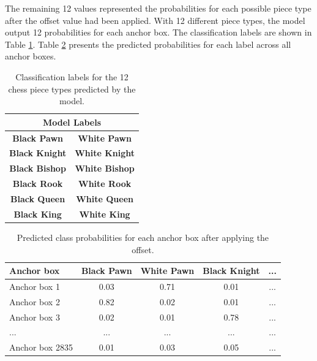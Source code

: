 The remaining 12 values represented the probabilities for each possible piece type after the offset value had been applied. With 12 different piece types, the model output 12 probabilities for each anchor box. The classification labels are shown in Table \ref{tab:piece-label-table}. Table \ref{tab:piece-probability-table} presents the predicted probabilities for each label across all anchor boxes. \\
\begin{table}[ht]
\renewcommand{\arraystretch}{1.2}  %
\centering
\caption[Labels for chess piece types]{Classification labels for the 12 chess piece types predicted by the model.}
\begin{tabular}{|c|c|}
\hline
\multicolumn{2}{|c|}{\textbf{Model Labels}} \\  
\hline
\textbf{Black Pawn} & \textbf{White Pawn} \\
\textbf{Black Knight} & \textbf{White Knight} \\
\textbf{Black Bishop} & \textbf{White Bishop} \\
\textbf{Black Rook} & \textbf{White Rook} \\
\textbf{Black Queen} & \textbf{White Queen} \\
\textbf{Black King} & \textbf{White King} \\
\hline
\end{tabular}
\label{tab:piece-label-table}
\end{table}



\begin{table}[h]
    \centering
    \caption[Predicted chess piece after applying offset]{Predicted class probabilities for each anchor box after applying the offset.}  %
    \renewcommand{\arraystretch}{1.5}
    \begin{tabular}{lcccc}
        \toprule
        \textbf{Anchor box} & \textbf{Black Pawn} & \textbf{White Pawn} & \textbf{Black Knight} & \textbf{...} \\
        \midrule
        Anchor box 1 & \raggedright 0.03 & \raggedright 0.71 & \raggedright 0.01 & ... \\
        Anchor box 2 & \raggedright 0.82 & \raggedright 0.02 & \raggedright 0.01 & ... \\
        Anchor box 3 & \raggedright 0.02 & \raggedright 0.01 & \raggedright 0.78 & ... \\
        ... & ... & ... & ... & ... \\
        Anchor box 2835 & \raggedright 0.01 & \raggedright 0.03 & \raggedright 0.05 & ... \\
        \bottomrule
    \end{tabular}
    \label{tab:piece-probability-table}
\end{table}

